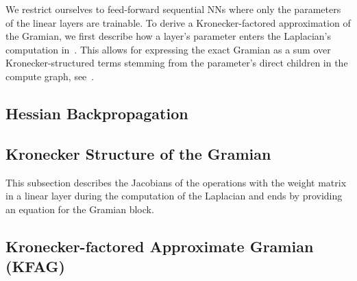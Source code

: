 We restrict ourselves to feed-forward sequential NNs where only the parameters of the linear layers are trainable.
To derive a Kronecker-factored approximation of the Gramian, we first describe how a layer's parameter enters the Laplacian's computation in~.
This allows for expressing the exact Gramian as a sum over Kronecker-structured terms stemming from the parameter's direct children in the compute graph, see~.

\subsection{Hessian Backpropagation}\label{sec:laplacian-computation-graph}


\subsection{Kronecker Structure of the Gramian}\label{sec:kronecker-structure-gramian}

This subsection describes the Jacobians of the operations with the weight matrix in
a linear layer during the computation of the Laplacian and ends by providing an
equation for the Gramian block.

\subsection{Kronecker-factored Approximate Gramian (KFAG)}

